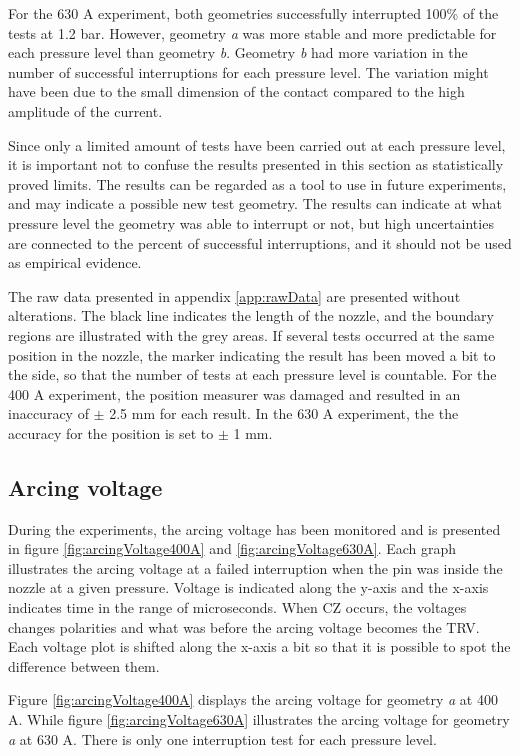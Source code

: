 \documentclass[10pt,a4paper,twoside]{article}
\begin{document}
For the 630 A experiment, both geometries successfully interrupted 100\% of the tests at 1.2 bar. However, geometry \textit{a} was more stable and more predictable for each pressure level than geometry \textit{b}. Geometry \textit{b} had more variation in the number of successful interruptions for each pressure level. The variation might have been due to the small dimension of the contact compared to the high amplitude of the current.

Since only a limited amount of tests have been carried out at each pressure level, it is important not to confuse the results presented in this section as statistically proved limits. The results can be regarded as a tool to use in future experiments, and may indicate a possible new test geometry. The results can indicate at what pressure level the geometry was able to interrupt or not, but high uncertainties are connected to the percent of successful interruptions, and it should not be used as empirical evidence.

The raw data presented in appendix \ref{app:rawData} are presented without alterations. The black line indicates the length of the nozzle, and the boundary regions are illustrated with the grey areas. If several tests occurred at the same position in the nozzle, the marker indicating the result has been moved a bit to the side, so that the number of tests at each pressure level is countable. For the 400 A experiment, the position measurer was damaged and resulted in an inaccuracy of $\pm$ 2.5 mm for each result. In the 630 A experiment, the the accuracy for the position is set to $\pm$ 1 mm.

\newpage
\subsection{Arcing voltage}
During the experiments, the arcing voltage has been monitored and is presented in figure \ref{fig:arcingVoltage400A} and \ref{fig:arcingVoltage630A}. Each graph illustrates the arcing voltage at a failed interruption when the pin was inside the nozzle at a given pressure. Voltage is indicated along the y-axis and the x-axis indicates time in the range of microseconds. When CZ occurs, the voltages changes polarities and what was before the arcing voltage becomes the TRV. Each voltage plot is shifted along the x-axis a bit so that it is possible to spot the difference between them.

Figure \ref{fig:arcingVoltage400A} displays the arcing voltage for geometry \textit{a} at 400 A. While figure \ref{fig:arcingVoltage630A} illustrates the arcing voltage for geometry \textit{a} at 630 A. There is only one interruption test for each pressure level.
\end{document}
